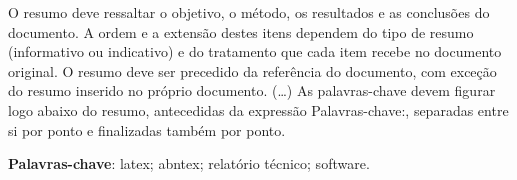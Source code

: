 \setlength{\absparsep}{18pt} %
\begin{resumo}
 O resumo deve ressaltar o objetivo, o método, os resultados e as conclusões do documento. A ordem e a extensão destes itens dependem do tipo de resumo (informativo ou indicativo) e do tratamento que cada item recebe no documento original. O resumo deve ser precedido da referência do documento, com exceção do resumo inserido no próprio documento. (\ldots) As palavras-chave devem figurar logo abaixo do resumo, antecedidas da expressão Palavras-chave:, separadas entre si por ponto e finalizadas também por ponto.

 \textbf{Palavras-chave}: latex; abntex; relatório técnico; software.
\end{resumo}

